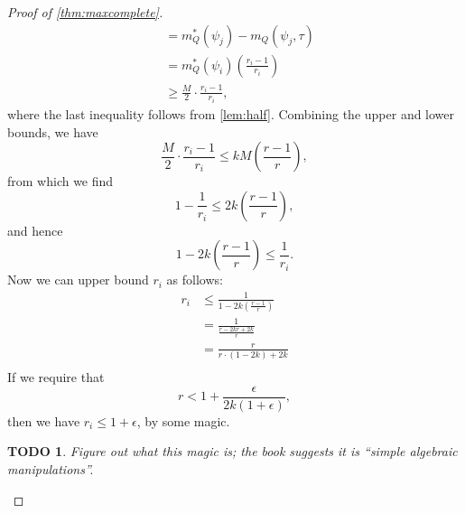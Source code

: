 \documentclass[]{article}
\theoremstyle{plain}
\newtheorem{todo}{TODO}
\theoremstyle{definition}
\begin{document}
\begin{proof}[Proof of \autoref{thm:maxcomplete}]
\begin{align*}
    & = m_Q^*(\psi_j) - m_Q(\psi_j, \tau) \\
    & = m_Q^*(\psi_i) \left(\frac{r_i - 1}{r_i}\right) \\
    & \geq \frac{M}{2} \cdot \frac{r_i - 1}{r_i},
  \end{align*}
  where the last inequality follows from \autoref{lem:half}.
  Combining the upper and lower bounds, we have
  \begin{equation*}
    \frac{M}{2} \cdot \frac{r_i - 1}{r_i} \leq kM \left(\frac{r - 1}{r}\right),
  \end{equation*}
  from which we find
  \begin{equation*}
    1 - \frac{1}{r_i} \leq 2k\left(\frac{r - 1}{r}\right),
  \end{equation*}
  and hence
  \begin{equation*}
    1 - 2k\left(\frac{r - 1}{r}\right) \leq \frac{1}{r_i}.
  \end{equation*}
  Now we can upper bound $r_i$ as follows:
  \begin{align*}
    r_i & \leq \frac{1}{1 - 2k\left(\frac{r - 1}{r}\right)} \\
    & = \frac{1}{\frac{r - 2kr + 2k}{r}} \\
    & = \frac{r}{r \cdot (1 - 2k) + 2k} \\
  \end{align*}
  If we require that
  \begin{equation*}
    r < 1 + \frac{\epsilon}{2k(1 + \epsilon)},
  \end{equation*}
  then we have $r_i \leq 1 + \epsilon$, by some magic.
  \begin{todo}
    Figure out what this magic is; the book suggests it is ``simple algebraic manipulations''.
  \end{todo}


\end{proof}
\end{document}

